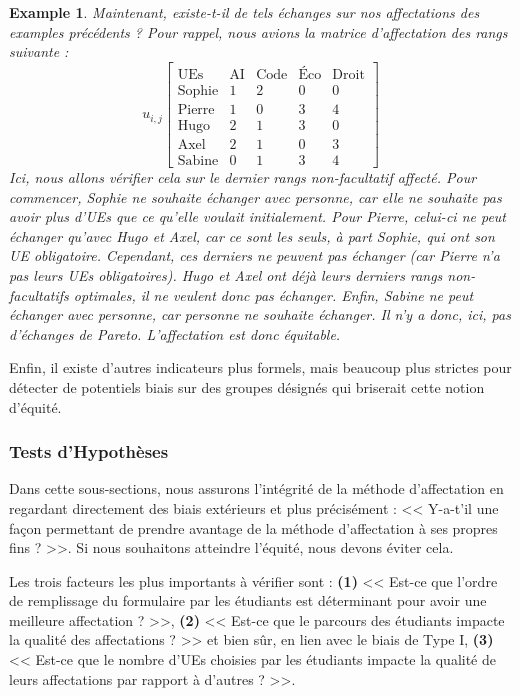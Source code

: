 \documentclass{rapport}
\theoremstyle{definition}
\theoremstyle{remark}
\theoremstyle{plain}
\newtheorem{example}{Example}
\theoremstyle{definition}
\theoremstyle{remark}
\begin{document}
\begin{example}\label{ex:running6}
    Maintenant, existe-t-il de tels échanges sur nos affectations des examples précédents ? Pour rappel, nous avions la matrice d'affectation des rangs suivante :
    $$
        u_{i,j}\begin{bmatrix}
            \text{UEs} & \text{AI} & \text{Code} & \text{Éco} & \text{Droit}\\
            \text{Sophie} & 1 & 2 & 0 & 0\\
            \text{Pierre} & 1 & 0 & 3 & 4\\
            \text{Hugo} & 2 & 1 & 3 & 0\\
            \text{Axel} & 2 & 1 & 0 & 3\\
            \text{Sabine} & 0 & 1 & 3 & 4
        \end{bmatrix}
    $$
    Ici, nous allons vérifier cela sur le dernier rangs non-facultatif affecté. Pour commencer, Sophie ne souhaite échanger avec personne, car elle ne souhaite pas avoir plus d'UEs que ce qu'elle voulait initialement. Pour Pierre, celui-ci ne peut échanger qu'avec Hugo et Axel, car ce sont les seuls, à part Sophie, qui ont son UE obligatoire. Cependant, ces derniers ne peuvent pas échanger (car Pierre n'a pas leurs UEs obligatoires).
    Hugo et Axel ont déjà leurs derniers rangs non-facultatifs optimales, il ne veulent donc pas échanger. Enfin, Sabine ne peut échanger avec personne, car personne ne souhaite échanger.
    Il n'y a donc, ici, pas d'échanges de Pareto. L'affectation est donc équitable.
\end{example}

Enfin, il existe d'autres indicateurs plus formels, mais beaucoup plus strictes pour détecter de potentiels biais sur des groupes désignés qui briserait cette notion d'équité.

\subsubsection{Tests d'Hypothèses}
Dans cette sous-sections, nous assurons l'intégrité de la méthode d'affectation en regardant directement des biais extérieurs et plus précisément : << Y-a-t'il une façon permettant de prendre avantage de la méthode d'affectation à ses propres fins ? >>.
Si nous souhaitons atteindre l'équité, nous devons éviter cela.

Les trois facteurs les plus importants à vérifier sont : \textbf{(1)} << Est-ce que l'ordre de remplissage du formulaire par les étudiants est déterminant pour avoir une meilleure affectation ? >>,
\textbf{(2)} << Est-ce que le parcours des étudiants impacte la qualité des affectations ? >> et bien sûr, en lien avec le biais de Type I,
\textbf{(3)} << Est-ce que le nombre d'UEs choisies par les étudiants impacte la qualité de leurs affectations par rapport à d'autres ? >>.
\end{document}
